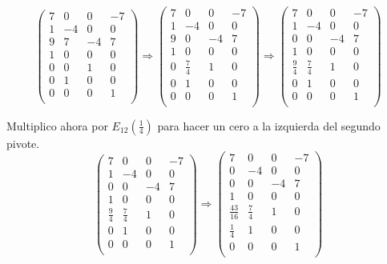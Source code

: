 \documentclass[11pt, a4paper]{article}
\newif\IfInSansMode
\theoremstyle{theorem-style}
\theoremstyle{definition-style}
\theoremstyle{remark-style}
\theoremstyle{example-style}
\begin{document}
$$\begin{pmatrix}
7 & 0 & 0 & -7\\
1 & -4 & 0 & 0\\
9 & 7 & -4 & 7\\
1 & 0 & 0 & 0\\
0 & 0 & 1 & 0\\
0 & 1 & 0 & 0\\
0 & 0 & 0 & 1\\
\end{pmatrix} \Longrightarrow
\begin{pmatrix}
7 & 0 & 0 & -7\\
1 & -4 & 0 & 0\\
9 & 0 & -4 & 7\\
1 & 0 & 0 & 0\\
0 & \frac{7}{4} & 1 & 0\\
0 & 1 & 0 & 0\\
0 & 0 & 0 & 1\\
\end{pmatrix} \Longrightarrow
\begin{pmatrix}
7 & 0 & 0 & -7\\
1 & -4 & 0 & 0\\
0 & 0 & -4 & 7\\
1 & 0 & 0 & 0\\
\frac{9}{4} & \frac{7}{4} & 1 & 0\\
0 & 1 & 0 & 0\\
0 & 0 & 0 & 1\\
\end{pmatrix}$$

Multiplico ahora por $E_{12}(\frac{1}{4})$ para hacer un cero a la izquierda del segundo pivote. \\

$$\begin{pmatrix}
7 & 0 & 0 & -7\\
1 & -4 & 0 & 0\\
0 & 0 & -4 & 7\\
1 & 0 & 0 & 0\\
\frac{9}{4} & \frac{7}{4} & 1 & 0\\
0 & 1 & 0 & 0\\
0 & 0 & 0 & 1\\
\end{pmatrix} \Longrightarrow 
\begin{pmatrix}
7 & 0 & 0 & -7\\
0 & -4 & 0 & 0\\
0 & 0 & -4 & 7\\
1 & 0 & 0 & 0\\
\frac{43}{16} & \frac{7}{4} & 1 & 0\\
\frac{1}{4} & 1 & 0 & 0\\
0 & 0 & 0 & 1\\
\end{pmatrix}$$
\end{document}
